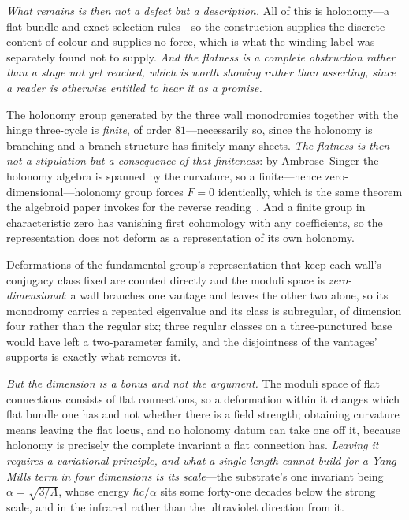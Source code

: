 \documentclass[11pt]{article}
\begin{document}
\emph{What remains is then not a defect but a description.} All of this is holonomy---a flat bundle and exact
selection rules---so the construction supplies the discrete content of colour and supplies no force, which is
what the winding label was separately found not to supply. \emph{And the flatness is a complete obstruction rather than a stage not yet reached, which is worth showing rather than asserting, since a reader is otherwise entitled to hear it as a promise.} 

The holonomy group generated by the three wall monodromies together with the hinge three-cycle is \emph{finite}, of order $81$---necessarily so, since the holonomy is branching and a branch structure has finitely many sheets. \emph{The flatness is then not a stipulation but a consequence of that finiteness}: by Ambrose--Singer the holonomy algebra is spanned by the curvature, so a finite---hence zero-dimensional---holonomy group forces $F=0$ identically, which is the same theorem the algebroid paper invokes for the reverse reading~\cite{JanzenAlgebroid}. And a finite group in characteristic zero has vanishing first cohomology with any coefficients, so the representation does not deform as a representation of its own holonomy. 

Deformations of the fundamental group's representation that keep each wall's conjugacy class fixed are counted directly and the moduli space is \emph{zero-dimensional}: a wall branches one vantage and leaves the other two alone, so its monodromy carries a repeated eigenvalue and its class is subregular, of dimension four rather than the regular six; three regular classes on a three-punctured base would have left a two-parameter family, and the disjointness of the vantages' supports is exactly what removes it. 

\emph{But the dimension is a bonus and not the argument.} The moduli space of flat connections consists of flat connections, so a deformation within it changes which flat bundle one has and not whether there is a field strength; obtaining curvature means leaving the flat locus, and no holonomy datum can take one off it, because holonomy is precisely the complete invariant a flat connection has. \emph{Leaving it requires a variational principle, and what a single length cannot build for a Yang--Mills term in four dimensions is its scale}---the substrate's one invariant being $\alpha=\sqrt{3/\Lambda}$, whose energy $\hbar c/\alpha$ sits some forty-one decades below the strong scale, and in the infrared rather than the ultraviolet direction from it.
\end{document}

